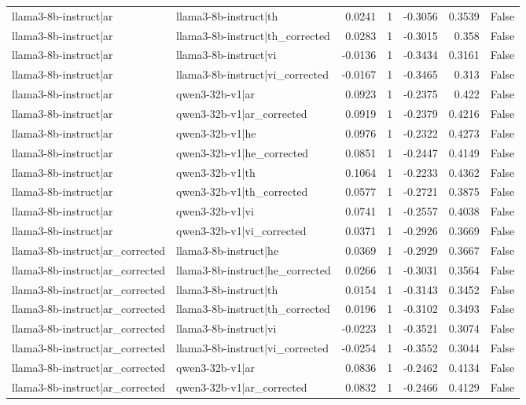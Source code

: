 \begin{table}
\begin{tabular}{l l r r r r l}
llama3-8b-instruct|ar & llama3-8b-instruct|th & 0.0241 & 1 & -0.3056 & 0.3539 & False \\
llama3-8b-instruct|ar & llama3-8b-instruct|th_corrected & 0.0283 & 1 & -0.3015 & 0.358 & False \\
llama3-8b-instruct|ar & llama3-8b-instruct|vi & -0.0136 & 1 & -0.3434 & 0.3161 & False \\
llama3-8b-instruct|ar & llama3-8b-instruct|vi_corrected & -0.0167 & 1 & -0.3465 & 0.313 & False \\
llama3-8b-instruct|ar & qwen3-32b-v1|ar & 0.0923 & 1 & -0.2375 & 0.422 & False \\
llama3-8b-instruct|ar & qwen3-32b-v1|ar_corrected & 0.0919 & 1 & -0.2379 & 0.4216 & False \\
llama3-8b-instruct|ar & qwen3-32b-v1|he & 0.0976 & 1 & -0.2322 & 0.4273 & False \\
llama3-8b-instruct|ar & qwen3-32b-v1|he_corrected & 0.0851 & 1 & -0.2447 & 0.4149 & False \\
llama3-8b-instruct|ar & qwen3-32b-v1|th & 0.1064 & 1 & -0.2233 & 0.4362 & False \\
llama3-8b-instruct|ar & qwen3-32b-v1|th_corrected & 0.0577 & 1 & -0.2721 & 0.3875 & False \\
llama3-8b-instruct|ar & qwen3-32b-v1|vi & 0.0741 & 1 & -0.2557 & 0.4038 & False \\
llama3-8b-instruct|ar & qwen3-32b-v1|vi_corrected & 0.0371 & 1 & -0.2926 & 0.3669 & False \\
llama3-8b-instruct|ar_corrected & llama3-8b-instruct|he & 0.0369 & 1 & -0.2929 & 0.3667 & False \\
llama3-8b-instruct|ar_corrected & llama3-8b-instruct|he_corrected & 0.0266 & 1 & -0.3031 & 0.3564 & False \\
llama3-8b-instruct|ar_corrected & llama3-8b-instruct|th & 0.0154 & 1 & -0.3143 & 0.3452 & False \\
llama3-8b-instruct|ar_corrected & llama3-8b-instruct|th_corrected & 0.0196 & 1 & -0.3102 & 0.3493 & False \\
llama3-8b-instruct|ar_corrected & llama3-8b-instruct|vi & -0.0223 & 1 & -0.3521 & 0.3074 & False \\
llama3-8b-instruct|ar_corrected & llama3-8b-instruct|vi_corrected & -0.0254 & 1 & -0.3552 & 0.3044 & False \\
llama3-8b-instruct|ar_corrected & qwen3-32b-v1|ar & 0.0836 & 1 & -0.2462 & 0.4134 & False \\
llama3-8b-instruct|ar_corrected & qwen3-32b-v1|ar_corrected & 0.0832 & 1 & -0.2466 & 0.4129 & False \\

\end{tabular}
\end{table}
